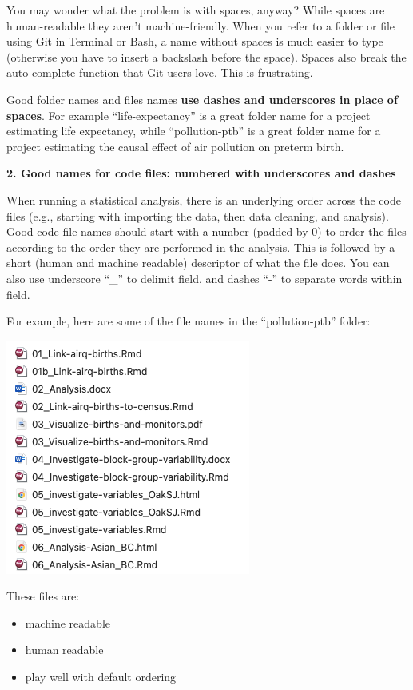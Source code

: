 \documentclass[
]{book}
\providecommand{\tightlist}{%
  \setlength{\itemsep}{0pt}\setlength{\parskip}{0pt}}
\begin{document}
You may wonder what the problem is with spaces, anyway? While
spaces are human-readable they aren't machine-friendly. When you refer to a
folder or file using Git in Terminal or Bash, a name without spaces is much
easier to type (otherwise you have to insert a backslash before the space).
Spaces also break the auto-complete function that Git users love. This is
frustrating.

Good folder names and files names \textbf{use dashes and underscores in place of spaces}.
For example ``life-expectancy'' is a great folder name for a project estimating
life expectancy, while ``pollution-ptb'' is a great folder name for a project
estimating the causal effect of air pollution on preterm birth.

\textbf{2. Good names for code files: numbered with underscores and dashes}

When running a statistical analysis, there is an underlying order across the
code files (e.g., starting with importing the data, then data cleaning, and
analysis). Good code file names should start with a number (padded by 0)
to order the files according to the order they are performed in the analysis. This is
followed by a short (human and machine readable) descriptor of what the file
does. You can also use underscore ``\_'' to delimit field, and dashes ``-'' to
separate words within field.

For example, here are some of the file names in the ``pollution-ptb'' folder:

\includegraphics[width=0.5\linewidth]{./figures/Variable-names-example}

These files are:

\begin{itemize}
\tightlist
\item
  machine readable\\
\item
  human readable\\
\item
  play well with default ordering
\end{itemize}
\end{document}
